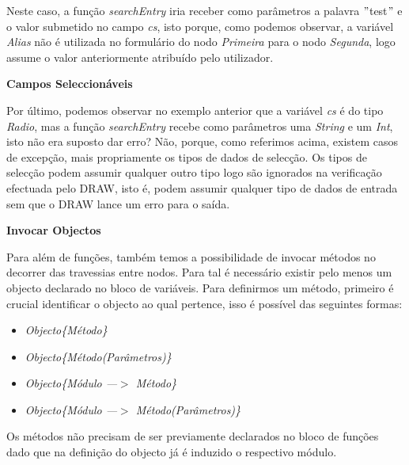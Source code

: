 \documentclass[a4paper]{article}
\begin{document}
\vspace{.2cm}

Neste caso, a função \emph{searchEntry} iria receber como parâmetros a palavra $"$test$"$ e o valor submetido no campo \emph{cs}, isto
porque, como podemos observar, a variável \emph{Alias} não é utilizada no formulário do nodo \emph{Primeira} para o nodo \emph{Segunda},
logo assume o valor anteriormente atribuído pelo utilizador.\\

\begin{small}
\textbf{Campos Seleccionáveis}\\
\end{small}

\hspace{1cm}Por último, podemos observar no exemplo anterior que a variável \emph{cs} é do tipo \emph{Radio}, mas a função
\emph{searchEntry} recebe como parâmetros uma \emph{String} e um \emph{Int}, isto não era suposto dar erro? Não, porque, como referimos
acima, existem casos de excepção, mais propriamente os tipos de dados de selecção. Os tipos de selecção podem assumir qualquer outro tipo
logo são ignorados na verificação efectuada pelo DRAW, isto é, podem assumir qualquer tipo de dados de entrada sem que o DRAW lance um
erro para o saída.\\

\begin{normalsize}
\textbf{Invocar Objectos}\\
\end{normalsize}

\hspace{1cm}Para além de funções, também temos a possibilidade de invocar métodos no decorrer das travessias entre nodos. Para tal é
necessário existir pelo menos um objecto declarado no bloco de variáveis. Para definirmos um método, primeiro é crucial identificar o
objecto ao qual pertence, isso é possível das seguintes formas:\\

\begin{itemize}
        \item \emph{Objecto\{Método\}}
        \item \emph{Objecto\{Método(Parâmetros)\}}
        \item \emph{Objecto\{Módulo —$>$ Método\}}
        \item \emph{Objecto\{Módulo —$>$ Método(Parâmetros)\}}
\end{itemize}

Os métodos não precisam de ser previamente declarados no bloco de funções dado que na definição do objecto já é induzido o respectivo
módulo.\\
\end{document}

